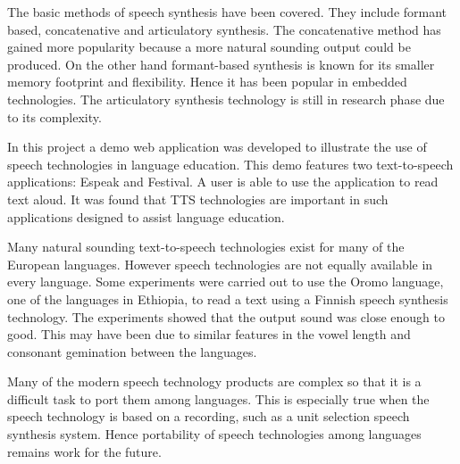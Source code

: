 \documentclass[11pt,a4paper,oneside,article]{memoir}
\begin{document}
The basic methods of speech synthesis have been covered. They include formant based, concatenative and articulatory synthesis. The concatenative method has gained more popularity because a more natural sounding output could be produced. On the other hand formant-based synthesis is known for its smaller memory footprint and flexibility. Hence it has been popular in embedded technologies. The articulatory synthesis technology is still in research phase due to its complexity.

In this project a demo web application was developed to illustrate the use of speech technologies in language education. This demo features two text-to-speech applications: Espeak and Festival. A user is able to use the application to read text aloud. It was found that TTS technologies are important in such applications designed to assist language education.

Many natural sounding text-to-speech technologies exist for many of the European languages. However speech technologies are not equally available in every language. Some experiments were carried out to use the Oromo language, one of the languages in Ethiopia, to read a text using a Finnish speech synthesis technology. The experiments showed that the output sound was close enough to good. This may have been due to similar features in the vowel length and consonant gemination between the languages. 

Many of the modern speech technology products are complex so that it is a difficult task to port them among languages. This is especially true when the speech technology is based on a recording, such as a unit selection speech synthesis system. Hence portability of speech technologies among languages remains work for the future. 

%
\clearpage
\end{document}
